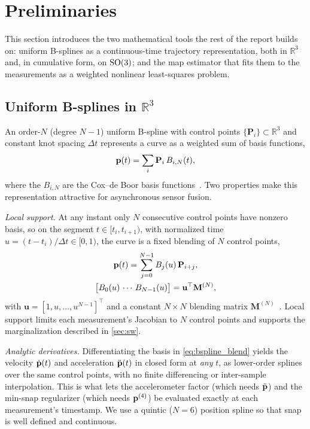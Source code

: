 \section{Preliminaries}
\label{sec:prelim}

This section introduces the two mathematical tools the rest of the
report builds on: uniform B-splines as a continuous-time trajectory
representation, both in $\mathbb{R}^3$ and, in cumulative form, on
$\mathrm{SO}(3)$; and the \ac{map} estimator that fits them to the measurements as
a weighted nonlinear least-squares problem. 

\subsection{Uniform B-splines in $\mathbb{R}^3$}
\label{sec:prelim_bspline}
An order-$N$ (degree $N{-}1$) uniform B-spline with control points
$\{\mathbf{P}_i\}\subset\mathbb{R}^3$ and constant knot spacing $\Delta t$
represents a curve as a weighted sum of basis functions,
\begin{equation}
  \mathbf{p}(t) = \sum_i \mathbf{P}_i\, B_{i,N}(t),
  \label{eq:bspline_def}
\end{equation}
where the $B_{i,N}$ are the Cox--de Boor basis
functions~\cite{furgale2013unified}.  Two properties make this
representation attractive for asynchronous sensor fusion.

\emph{Local support.}  At any instant only $N$ consecutive control
points have nonzero basis, so on the segment $t\in[t_i,t_{i+1})$, with
normalized time $u=(t-t_i)/\Delta t\in[0,1)$, the curve is a fixed
blending of $N$ control points,
\begin{equation}
  \begin{gathered}
  \mathbf{p}(t) = \sum_{j=0}^{N-1} B_j(u)\,\mathbf{P}_{i+j}, \\
  \bigl[B_0(u)\,\cdots\,B_{N-1}(u)\bigr]
     = \mathbf{u}^{\top}\mathbf{M}^{(N)},
  \end{gathered}
  \label{eq:bspline_blend}
\end{equation}
with $\mathbf{u}=[1,u,\dots,u^{N-1}]^{\top}$ and a constant $N\times N$
blending matrix $\mathbf{M}^{(N)}$~\cite{usenko2020basalt}.  Local
support limits each measurement's Jacobian to $N$ control points and
supports the marginalization described in \autoref{sec:sw}.

\emph{Analytic derivatives.}  Differentiating the basis in
\eqref{eq:bspline_blend} yields the velocity $\dot{\mathbf{p}}(t)$ and
acceleration $\ddot{\mathbf{p}}(t)$ in closed form at \emph{any} $t$, as
lower-order splines over the same control points, with no finite
differencing or inter-sample interpolation.  This is what lets the
accelerometer factor (which needs $\ddot{\mathbf{p}}$) and the min-snap
regularizer (which needs $\mathbf{p}^{(4)}$) be evaluated exactly at each
measurement's timestamp.  We use a quintic ($N{=}6$) position spline so
that snap is well defined and continuous.

